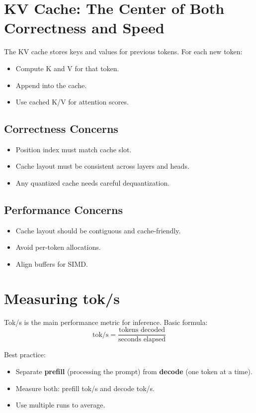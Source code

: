 \documentclass[11pt]{article}
\begin{document}
\section{KV Cache: The Center of Both Correctness and Speed}
The KV cache stores keys and values for previous tokens. For each new token:
\begin{itemize}
  \item Compute K and V for that token.
  \item Append into the cache.
  \item Use cached K/V for attention scores.
\end{itemize}

\subsection{Correctness Concerns}
\begin{itemize}
  \item Position index must match cache slot.
  \item Cache layout must be consistent across layers and heads.
  \item Any quantized cache needs careful dequantization.
\end{itemize}

\subsection{Performance Concerns}
\begin{itemize}
  \item Cache layout should be contiguous and cache-friendly.
  \item Avoid per-token allocations.
  \item Align buffers for SIMD.
\end{itemize}

\section{Measuring tok/s}
Tok/s is the main performance metric for inference. Basic formula:
\[\text{tok/s} = \frac{\text{tokens decoded}}{\text{seconds elapsed}}\]

Best practice:
\begin{itemize}
  \item Separate \textbf{prefill} (processing the prompt) from \textbf{decode} (one token at a time).
  \item Measure both:\; prefill tok/s and decode tok/s.
  \item Use multiple runs to average.
\end{itemize}
\end{document}
